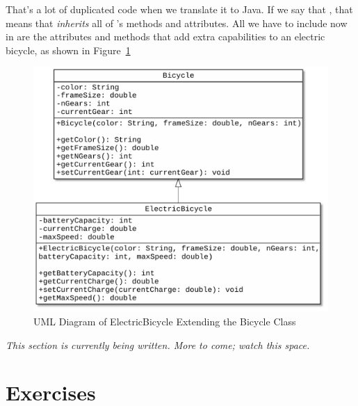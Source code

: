 That's a lot of duplicated code when we translate it to Java. If we say that
, that means that  {\em inherits} all of 's methods and attributes. All we have to include now in  are the attributes and methods that add extra capabilities to an electric bicycle, as shown in Figure~\ref{fig.inheritedBikes}

\begin{figure}[!h]
\begin{center}
\includegraphics[scale=0.5]{figs/ch14/inherited_bikes.pdf}
\caption{UML Diagram of ElectricBicycle Extending the Bicycle Class}
\label{fig.inheritedBikes}
\end{center}
\end{figure}



{\em This section is currently being written. More to come; watch this space.}

\section{Exercises}

